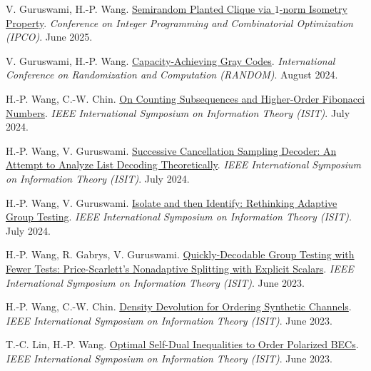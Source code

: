 \documentclass{article}
\def\sec#1{\vskip1em\textbf{\fs1#1}}
\def\fs#1{%
        \pgfmathsetmacro\a{#1}%
        \pgfmathsetmacro\A{\parskip*(4/3)^\a}%
        \pgfmathsetmacro\B{\A*(4/3)}%
        \fontsize{\A pt}{\B pt}\selectfont%
    }
\begin{document}
\bgroup
\def\section#1#2{\sec{Peer-Reviewed Conference Publications \mdseries (new to old)}}
\begin{thebibliography}{C99}
    V. Guruswami, H.-P. Wang.
    \href{https://doi.org/10.1007/978-3-031-93112-3_20}
    {Semirandom Planted Clique via $1$-norm Isometry Property}.
    \emph{Conference on Integer Programming and Combinatorial Optimization (IPCO)}.
    June 2025.
    
    V. Guruswami, H.-P. Wang.
    \href{https://doi.org/10.4230/LIPIcs.APPROX/RANDOM.2024.65}
    {Capacity-Achieving Gray Codes}.
    \emph{International Conference on Randomization and Computation (RANDOM)}.
    August 2024.

    H.-P. Wang, C.-W. Chin.
    \href{https://doi.org/10.1109/ISIT57864.2024.10619178}
    {On Counting Subsequences and Higher-Order Fibonacci Numbers}.
    \emph{IEEE International Symposium on Information Theory (ISIT)}.
    July 2024.
 
    H.-P. Wang, V. Guruswami.
    \href{https://doi.org/10.1109/ISIT57864.2024.10619251}
    {Successive Cancellation Sampling Decoder: An Attempt to Analyze List Decoding Theoretically}.
    \emph{IEEE International Symposium on Information Theory (ISIT)}.
    July 2024.
 
    H.-P. Wang, V. Guruswami.
    \href{https://doi.org/10.1109/ISIT57864.2024.10619098}
    {Isolate and then Identify: Rethinking Adaptive Group Testing}.
    \emph{IEEE International Symposium on Information Theory (ISIT)}.
    July 2024.

    H.-P. Wang, R. Gabrys, V. Guruswami.
    \href{https://doi.org/10.1109/ISIT54713.2023.10206843}
    {Quickly-Decodable Group Testing with Fewer Tests: Price-Scarlett's Nonadaptive Splitting with Explicit Scalars}.
    \emph{IEEE International Symposium on Information Theory (ISIT)}.
    June 2023.

    H.-P. Wang, C.-W. Chin.
    \href{https://doi.org/10.1109/ISIT54713.2023.10206540}
    {Density Devolution for Ordering Synthetic Channels}.
    \emph{IEEE International Symposium on Information Theory (ISIT)}.
    June 2023.

    T.-C. Lin, H.-P. Wang.
    \href{https://doi.org/10.1109/ISIT54713.2023.10206451}
    {Optimal Self-Dual Inequalities to Order Polarized BECs}.
    \emph{IEEE International Symposium on Information Theory (ISIT)}.
    June 2023.


\end{thebibliography}
\end{document}
